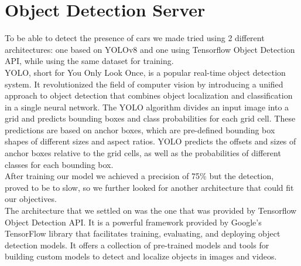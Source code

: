 \documentclass[17pt]{report}
\begin{document}
\pagebreak
\section{Object Detection Server} 
\indent \indent
To be able to detect the presence of cars we made tried using 2 different 
architectures: one based on YOLOv8 and one using Tensorflow Object Detection API, 
while using the same dataset for training.\\
\indent
YOLO, short for You Only Look Once, is a popular real-time object detection system.
It revolutionized the field of computer vision by introducing a unified approach to
object detection that combines object localization and classification in a single
neural network. The YOLO algorithm divides an input image into a grid and predicts
bounding boxes and class probabilities for each grid cell. These predictions are
based on anchor boxes, which are pre-defined bounding box shapes of different sizes
and aspect ratios. YOLO predicts the offsets and sizes of anchor boxes relative to
the grid cells, as well as the probabilities of different classes for each bounding
box. \\
\indent
After training our model we achieved a precision of 75\% but the detection, proved 
to be to slow, so we further looked for another architecture that could fit our objectives. \\
\indent
The architecture that we settled on was the one that was provided by Tensorflow
Object Detection API. It is a powerful framework provided by Google's TensorFlow
library that facilitates training, evaluating, and deploying object detection
models. It offers a collection of pre-trained models and tools for building custom
models to detect and localize objects in images and videos. 
\end{document}
